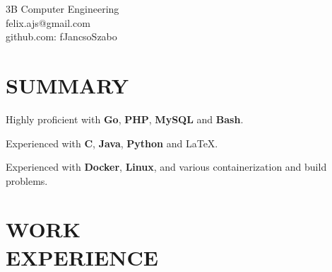 \documentclass[margin,line]{resume}
\begin{document}
{
    \hfill 3B Computer Engineering \vspace{0mm} \\\vspace{0mm}
    \hfill felix.ajs@gmail.com       \vspace{0mm}\\\vspace{0mm}
    \hfill github.com: fJancsoSzabo \vspace{0mm}\\\vspace{-9mm}
}

\begin{resume}

    \section{\mysidestyle \textbf{\large{S}\small{UMMARY}}}

    \begin{tightemizenoindent}
    \item Highly proficient with \textbf{Go}, \textbf{PHP}, \textbf{MySQL} and \textbf{Bash}.
    \item Experienced with \textbf{C}, \textbf{Java}, \textbf{Python} and \LaTeX.
    \item Experienced with \textbf{Docker}, \textbf{Linux}, and various containerization and build problems.
    \end{tightemizenoindent}

    \vspace{-1mm}

\sectionline

\section{\mysidestyle \textbf{\large{W}\small{ORK}\\ \large{E}\small{XPERIENCE}}}


\end{resume}
\end{document}
